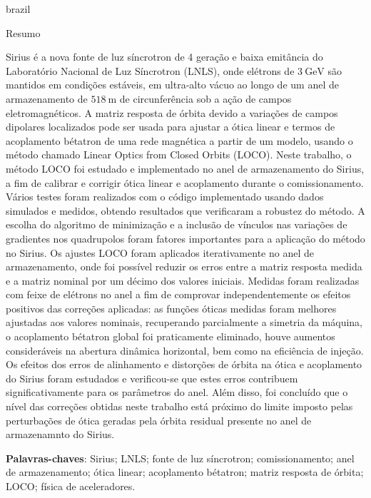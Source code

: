 \begin{otherlanguage*}{brazil}
\renewcommand{\sfdefault}{\rmdefault}
    \begin{center}{\ABNTEXchapterfont\huge Resumo}\end{center}
    
    Sirius é a nova fonte de luz síncrotron de 4 geração e baixa emitância do Laboratório Nacional de Luz Síncrotron (LNLS), onde elétrons de $\SI{3}{\giga\electronvolt}$ são mantidos em condições estáveis, em ultra-alto vácuo ao longo de um anel de armazenamento de $\SI{518}{\meter}$ de circunferência sob a ação de campos eletromagnéticos. A matriz resposta de órbita devido a variações de campos dipolares localizados pode ser usada para ajustar a ótica linear e termos de acoplamento bétatron de uma rede magnética a partir de um modelo, usando o método chamado Linear Optics from Closed Orbits (LOCO). Neste trabalho, o método LOCO foi estudado e implementado no anel de armazenamento do Sirius, a fim de calibrar e corrigir ótica linear e acoplamento durante o comissionamento. Vários testes foram realizados com o código implementado usando dados simulados e medidos, obtendo resultados que verificaram a robustez do método. A escolha do algoritmo de minimização e a inclusão de vínculos nas variações de gradientes nos quadrupolos foram fatores importantes para a aplicação do método no Sirius. Os ajustes LOCO foram aplicados iterativamente no anel de armazenamento, onde foi possível reduzir os erros entre a matriz resposta medida e a matriz nominal por um décimo dos valores iniciais. Medidas foram realizadas com feixe de elétrons no anel a fim de comprovar independentemente os efeitos positivos das correções aplicadas: as funções óticas medidas foram melhores ajustadas aos valores nominais, recuperando parcialmente a simetria da máquina, o acoplamento bétatron global foi praticamente eliminado, houve aumentos consideráveis na abertura dinâmica horizontal, bem como na eficiência de injeção. Os efeitos dos erros de alinhamento e distorções de órbita na ótica e acoplamento do Sirius foram estudados e verificou-se que estes erros contribuem significativamente para os parâmetros do anel. Além disso, foi concluído que o nível das correções obtidas neste trabalho está próximo do limite imposto pelas perturbações de ótica geradas pela órbita residual presente no anel de armazenamnto do Sirius.
    
    \vspace{\onelineskip}
    \noindent\textbf{Palavras-chaves}: Sirius; LNLS; fonte de luz síncrotron; comissionamento; anel de armazenamento; ótica linear; acoplamento bétatron; matriz resposta de órbita; LOCO; física de aceleradores.
    \vspace{\fill}
\end{otherlanguage*}
\cleardoublepage

